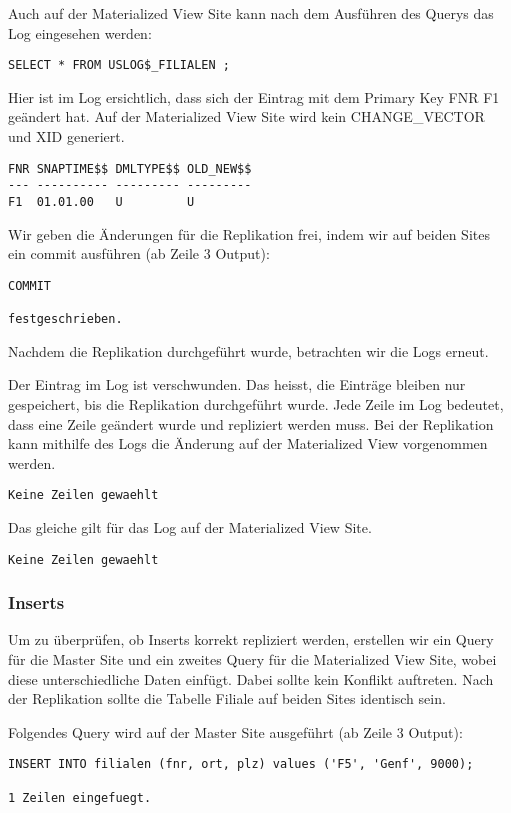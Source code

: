 \documentclass[11pt,a4paper,parskip=half]{scrartcl}
\begin{document}
Auch auf der Materialized View Site kann nach dem Ausführen des Querys das Log eingesehen werden:
\begin{lstlisting}
SELECT * FROM USLOG$_FILIALEN ;
\end{lstlisting}

Hier ist im Log ersichtlich, dass sich der Eintrag mit dem Primary Key FNR F1 geändert hat. Auf der Materialized View Site wird kein CHANGE\_VECTOR und XID generiert.
\begin{lstlisting}
FNR SNAPTIME$$ DMLTYPE$$ OLD_NEW$$
--- ---------- --------- ---------
F1  01.01.00   U         U         
\end{lstlisting}

Wir geben die Änderungen für die Replikation frei, indem wir auf beiden Sites ein commit ausführen (ab Zeile 3 Output):
\begin{lstlisting}
COMMIT

festgeschrieben.
\end{lstlisting}

Nachdem die Replikation durchgeführt wurde, betrachten wir die Logs erneut.

Der Eintrag im Log ist verschwunden. Das heisst, die Einträge bleiben nur gespeichert, bis die Replikation durchgeführt wurde. Jede Zeile im Log bedeutet, dass eine Zeile geändert wurde und repliziert werden muss. Bei der Replikation kann mithilfe des Logs die Änderung auf der Materialized View vorgenommen werden.
\begin{lstlisting}
Keine Zeilen gewaehlt
\end{lstlisting}

Das gleiche gilt für das Log auf der Materialized View Site.
\begin{lstlisting}
Keine Zeilen gewaehlt
\end{lstlisting}

\subsubsection{Inserts}
Um zu überprüfen, ob Inserts korrekt repliziert werden, erstellen wir ein Query für die Master Site und ein zweites Query für die Materialized View Site, wobei diese unterschiedliche Daten einfügt. Dabei sollte kein Konflikt auftreten. Nach der Replikation sollte die Tabelle Filiale auf beiden Sites identisch sein.

Folgendes Query wird auf der Master Site ausgeführt (ab Zeile 3 Output):
\begin{lstlisting}
INSERT INTO filialen (fnr, ort, plz) values ('F5', 'Genf', 9000);

1 Zeilen eingefuegt.
\end{lstlisting}
\end{document}
